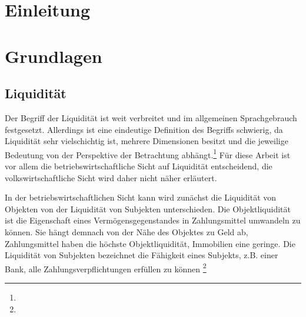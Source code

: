 \seInhaltsverzeichnis[
einrueckung=ja,
gliederungsebenen=4
]





\chapter{Einleitung}

\chapter{Grundlagen}

\section{Liquidität}

Der Begriff der Liquidität ist weit verbreitet und im allgemeinen Sprachgebrauch festgesetzt. Allerdings ist eine eindeutige Definition des Begriffs schwierig, da Liquidität sehr vielschichtig ist, mehrere Dimensionen besitzt und die jeweilige Bedeutung von der Perspektive der Betrachtung abhängt.\footnote{ } Für diese Arbeit ist vor allem die betriebswirtschaftliche Sicht auf Liquidität entscheidend, die volkswirtschaftliche Sicht wird daher nicht näher erläutert.

In der betriebswirtschaftlichen Sicht kann wird zunächst die Liquidität von Objekten von der Liquidität von Subjekten unterschieden. Die Objektliquidität ist die Eigenschaft eines Vermögensgegenstandes in Zahlungsmittel umwandeln zu können. Sie hängt demnach von der Nähe des Objektes zu Geld ab, Zahlungsmittel haben die höchste Objektliquidität, Immobilien eine geringe. Die Liquidität von Subjekten bezeichnet die Fähigkeit eines Subjekts, z.B. einer Bank, alle Zahlungsverpflichtungen erfüllen zu können \footnote{ }

